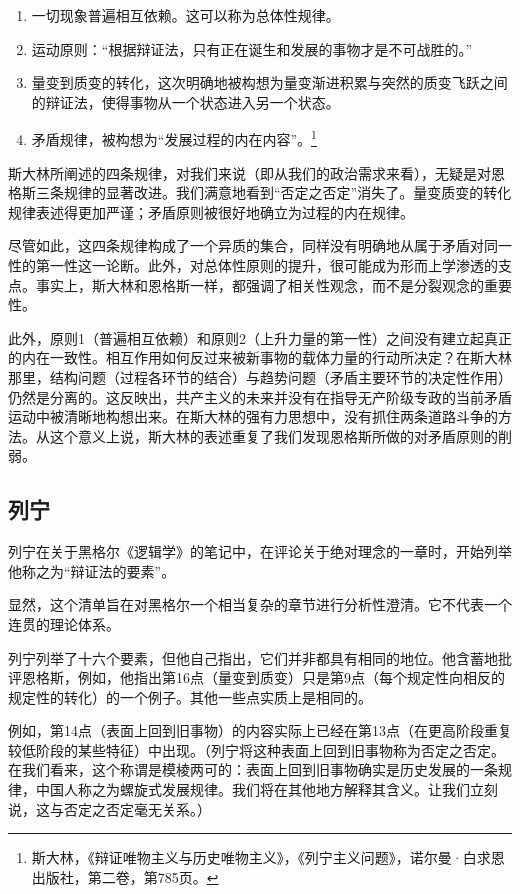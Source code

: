 \documentclass[fontset=fandol, a4paper, 12pt, twoside]{ctexart}
\begin{document}
\begin{enumerate}
    \item 一切现象普遍相互依赖。这可以称为总体性规律。
    \item 运动原则：“根据辩证法，只有正在诞生和发展的事物才是不可战胜的。”
    \item 量变到质变的转化，这次明确地被构想为量变渐进积累与突然的质变飞跃之间的辩证法，使得事物从一个状态进入另一个状态。
    \item 矛盾规律，被构想为“发展过程的内在内容”。\footnote{斯大林，《辩证唯物主义与历史唯物主义》，《列宁主义问题》，诺尔曼·白求恩出版社，第二卷，第785页。}
\end{enumerate}

斯大林所阐述的四条规律，对我们来说（即从我们的政治需求来看），无疑是对恩格斯三条规律的显著改进。我们满意地看到“否定之否定”消失了。量变质变的转化规律表述得更加严谨；矛盾原则被很好地确立为过程的内在规律。

尽管如此，这四条规律构成了一个异质的集合，同样没有明确地从属于矛盾对同一性的第一性这一论断。此外，对总体性原则的提升，很可能成为形而上学渗透的支点。事实上，斯大林和恩格斯一样，都强调了相关性观念，而不是分裂观念的重要性。

此外，原则1（普遍相互依赖）和原则2（上升力量的第一性）之间没有建立起真正的内在一致性。相互作用如何反过来被新事物的载体力量的行动所决定？在斯大林那里，结构问题（过程各环节的结合）与趋势问题（矛盾主要环节的决定性作用）仍然是分离的。这反映出，共产主义的未来并没有在指导无产阶级专政的当前矛盾运动中被清晰地构想出来。在斯大林的强有力思想中，没有抓住两条道路斗争的方法。从这个意义上说，斯大林的表述重复了我们发现恩格斯所做的对矛盾原则的削弱。

\subsection{列宁}

列宁在关于黑格尔《逻辑学》的笔记中，在评论关于绝对理念的一章时，开始列举他称之为“辩证法的要素”。

显然，这个清单旨在对黑格尔一个相当复杂的章节进行分析性澄清。它不代表一个连贯的理论体系。

列宁列举了十六个要素，但他自己指出，它们并非都具有相同的地位。他含蓄地批评恩格斯，例如，他指出第16点（量变到质变）只是第9点（每个规定性向相反的规定性的转化）的一个例子。其他一些点实质上是相同的。

例如，第14点（表面上回到旧事物）的内容实际上已经在第13点（在更高阶段重复较低阶段的某些特征）中出现。（列宁将这种表面上回到旧事物称为否定之否定。在我们看来，这个称谓是模棱两可的：表面上回到旧事物确实是历史发展的一条规律，中国人称之为螺旋式发展规律。我们将在其他地方解释其含义。让我们立刻说，这与否定之否定毫无关系。）
\end{document}
